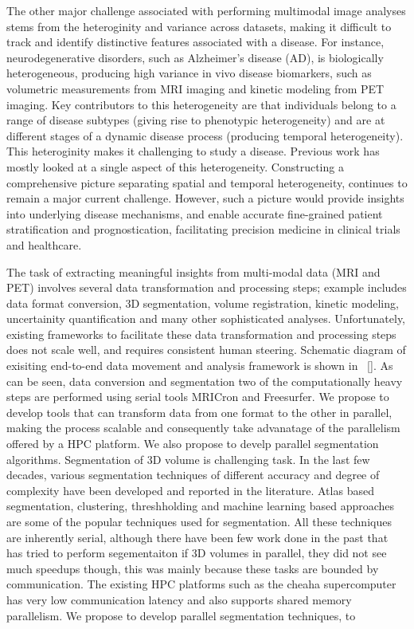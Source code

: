 \documentclass[11pt]{article}
\begin{document}
The other major challenge associated with performing multimodal image analyses stems from the heteroginity and variance across datasets, making it difficult to track and identify distinctive features associated with a disease. For instance, neurodegenerative disorders, such as Alzheimer’s disease (AD), is biologically heterogeneous, producing high variance in vivo disease biomarkers, 
such as volumetric measurements from MRI imaging and kinetic modeling from PET imaging. Key contributors to this heterogeneity are that individuals belong to a range of disease subtypes (giving rise to phenotypic heterogeneity) and are at different stages of a dynamic disease process (producing temporal heterogeneity). This heteroginity makes it challenging to study a disease.
Previous work has mostly looked at a single aspect of this heterogeneity. Constructing a comprehensive picture separating spatial and temporal heterogeneity, continues to remain a major current challenge. However, such a picture would provide insights into underlying disease mechanisms, and enable accurate fine-grained patient stratification and prognostication, facilitating precision medicine in clinical trials and healthcare.

The task of extracting meaningful insights from multi-modal data (MRI and PET) involves several data transformation and processing steps;
example includes data format conversion, 3D segmentation, volume registration, kinetic modeling, uncertainity quantification and many other sophisticated analyses.
Unfortunately, existing frameworks to facilitate these data transformation and processing steps does not scale well, and requires consistent human steering. 
Schematic diagram of exisiting end-to-end data movement and analysis framework is shown in ~\ref{}. As can be seen, data conversion and segmentation two of the computationally heavy steps are performed using serial tools MRICron and Freesurfer. We propose to develop tools that can transform data from one format to the other in parallel, making the process scalable and consequently take advanatage of the parallelism offered by a HPC platform. We also propose to develp parallel segmentation algorithms. Segmentation of 3D volume is challenging task.
In the last few decades, various segmentation techniques of different accuracy and degree of complexity have been developed and reported in the literature. Atlas based segmentation, clustering, threshholding and machine learning based approaches are some of the popular techniques used for segmentation. All these techniques are inherently serial, although there have been few work done in the past that has tried to perform segementaiton if 3D volumes in parallel, they did not see much speedups though, this was mainly because these tasks are bounded by communication. The existing HPC platforms such as the cheaha supercomputer has very low communication latency and also supports shared memory parallelism. We propose to develop parallel segmentation techniques, to 
\end{document}
